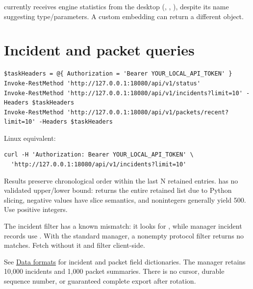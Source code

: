  currently receives engine statistics from the desktop (, , ), despite its name suggesting type/parameters. A custom embedding can return a different object.

\section*{Incident and packet queries}
\par\noindent\begin{minipage}{\linewidth}
\begin{lstlisting}[title={POWERSHELL}]
$taskHeaders = @{ Authorization = 'Bearer YOUR_LOCAL_API_TOKEN' }
Invoke-RestMethod 'http://127.0.0.1:18080/api/v1/status'
Invoke-RestMethod 'http://127.0.0.1:18080/api/v1/incidents?limit=10' -Headers $taskHeaders
Invoke-RestMethod 'http://127.0.0.1:18080/api/v1/packets/recent?limit=10' -Headers $taskHeaders
\end{lstlisting}
\end{minipage}\par
\par\noindent\begin{minipage}{\linewidth}
Linux equivalent:
\begin{lstlisting}[title={BASH}]
curl -H 'Authorization: Bearer YOUR_LOCAL_API_TOKEN' \
  'http://127.0.0.1:18080/api/v1/incidents?limit=10'
\end{lstlisting}
\end{minipage}\par
Results preserve chronological order within the last N retained entries.  has no validated upper/lower bound:  returns the entire retained list due to Python slicing, negative values have slice semantics, and nonintegers generally yield 500. Use positive integers.

The incident  filter has a known mismatch: it looks for , while manager incident records use . With the standard manager, a nonempty protocol filter returns no matches. Fetch without it and filter  client-side.

See \hyperref[chapter-10]{Data formats} for incident and packet field dictionaries. The manager retains 10,000 incidents and 1,000 packet summaries. There is no cursor, durable sequence number, or guaranteed complete export after rotation.

